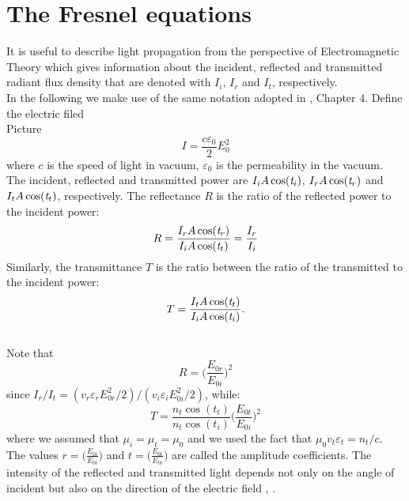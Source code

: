 \section{The Fresnel equations}
It is useful to describe light propagation from the perspective of Electromagnetic Theory which gives information about the incident, reflected and transmitted radiant flux density that are denoted with $I_i$, $I_r$ and $I_t$, respectively. \\
In the following we make use of the same notation adopted in \cite{hecht1998hecht}, Chapter $4$.
Define the electric filed\\
Picture
 \begin{equation}
I = \frac{c\varepsilon_0}{2}E_0^2
\end{equation} where $c$ is the speed of light in vacuum, $\varepsilon_0$ is the permeability in the vacuum.\\
The incident, reflected and transmitted power are $I_i A \cos(\textit{t}_i)$, $I_r A \cos(\textit{t}_r)$ and $I_t A \cos(\textit{t}_t)$, respectively.
The reflectance $R$ is the ratio of the reflected power to the incident power:
\begin{equation}\label{reflectance}
R = \frac{I_r A \cos(\textit{t}_r)}{I_i A \cos(\textit{t}_t)} = \frac{I_r}{I_i}
\end{equation}
Similarly, the transmittance $T$ is the ratio between the ratio of the transmitted to the incident power:
\begin{equation}\label{transmittance}
T = \frac{I_t A \cos(\textit{t}_t)}{I_i A \cos(\textit{t}_i)} .
\end{equation}\\
Note that 
\begin{equation}\label{R}
R = \Big(\frac{E_{0 r}}{E_{0 i}}\Big)^2
\end{equation}
since $ I_r/I_t = (v_r\varepsilon_r E_{0r}^2/2)/(v_i\varepsilon_i E_{0i}^2/2)$, 
while: \begin{equation}\label{T}
T = \frac{n_t \cos(t_t)}{n_t \cos(t_i)}\Big(\frac{E_{0 t}}{E_{0 i}}\Big)^2
\end{equation}
where we assumed that $\mu_i = \mu_t  = \mu_0$ and we used the fact that $\mu_0 v_t\varepsilon_t=n_t/c$.
The values $r = \Big(\frac{E_{0 i}}{E_{0 i}}\Big)$ and $t = \Big(\frac{E_{0 t}}{E_{0 i}}\Big)$ are called the amplitude coefficients.  
The intensity of the reflected and transmitted light depends not only on the angle of incident but also on the direction of the electric field , 
\cite{feynman1964feynman}.
